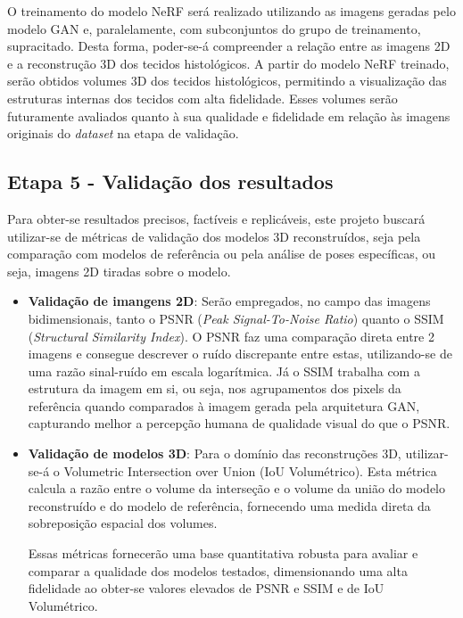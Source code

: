 O treinamento do modelo NeRF será realizado utilizando as imagens geradas pelo modelo GAN e, paralelamente, com subconjuntos do grupo de treinamento, supracitado. Desta forma, poder-se-á compreender a relação entre as imagens 2D e a reconstrução 3D dos tecidos histológicos. A partir do modelo NeRF treinado, serão obtidos volumes 3D dos tecidos histológicos, permitindo a visualização das estruturas internas dos tecidos com alta fidelidade. Esses volumes serão futuramente avaliados quanto à sua qualidade e fidelidade em relação às imagens originais do \textit{dataset} na etapa de validação. 

\subsection{Etapa 5 - Validação dos resultados}

Para obter-se resultados precisos, factíveis e replicáveis, este projeto buscará utilizar-se de métricas de validação dos modelos 3D reconstruídos, seja pela comparação com modelos de referência ou pela análise de poses específicas, ou seja, imagens 2D tiradas sobre o modelo.

\begin{itemize}

  \item \textbf{Validação de imangens 2D}: Serão empregados, no campo das imagens bidimensionais, tanto o PSNR (\textit{Peak Signal-To-Noise Ratio}) quanto o SSIM (\textit{Structural Similarity Index}). O PSNR faz uma comparação direta entre 2 imagens e consegue descrever o ruído discrepante entre estas, utilizando-se de uma razão sinal-ruído em escala logarítmica. Já o SSIM trabalha com a estrutura da imagem em si, ou seja, nos agrupamentos dos pixels da referência quando comparados à imagem gerada pela arquitetura GAN, capturando melhor a percepção humana de qualidade visual do que o PSNR.

  \item \textbf{Validação de modelos 3D}: Para o domínio das reconstruções 3D, utilizar-se-á o Volumetric Intersection over Union (IoU Volumétrico). Esta métrica calcula a razão entre o volume da interseção e o volume da união do modelo reconstruído e do modelo de referência, fornecendo uma medida direta da sobreposição espacial dos volumes.

Essas métricas fornecerão uma base quantitativa robusta para avaliar e comparar a qualidade dos modelos testados, dimensionando uma alta fidelidade ao obter-se valores elevados de PSNR e SSIM e de IoU Volumétrico.

\end{itemize}



